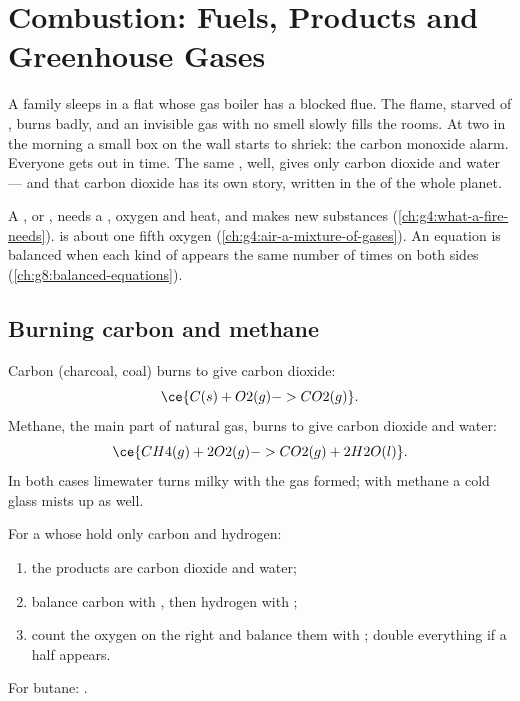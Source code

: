 \chapter{Combustion: Fuels, Products and Greenhouse Gases}\label{ch:g8:combustion-and-fuels}

A family sleeps in a flat whose gas boiler has a blocked flue. The flame,
starved of , burns badly, and an invisible gas with no smell slowly
fills the rooms. At two in the morning a small box on the wall starts to
shriek: the carbon monoxide alarm. Everyone gets out in time. The same
,  well, gives only carbon dioxide and water --- and that
carbon dioxide has its own story, written in the  of the whole
planet.

\begin{recall}
A , or , needs a , oxygen and heat, and makes new
substances (\cref{ch:g4:what-a-fire-needs}).  is about one fifth
oxygen (\cref{ch:g4:air-a-mixture-of-gases}). An equation is balanced
when each kind of  appears the same number of times on both sides
(\cref{ch:g8:balanced-equations}).
\end{recall}

\section{Burning carbon and methane}

\begin{example}\label{ex:g8:combustion-and-fuels:two}
Carbon (charcoal, coal) burns to give carbon dioxide:
\[
  \ce{C(s) + O2(g) -> CO2(g)}.
\]
Methane, the main part of natural gas, burns to give carbon dioxide and
water:
\[
  \ce{CH4(g) + 2O2(g) -> CO2(g) + 2H2O(l)}.
\]
In both cases limewater turns milky with the gas formed; with methane a
cold glass mists up as well.
\end{example}

\begin{method}\label{met:g8:combustion-and-fuels:write}
For a  whose  hold only carbon and hydrogen:
\begin{enumerate}
  \item the products are carbon dioxide and water;
  \item balance carbon with , then hydrogen with ;
  \item count the oxygen  on the right and balance them with
        ; double everything if a half appears.
\end{enumerate}
For butane: .
\end{method}


